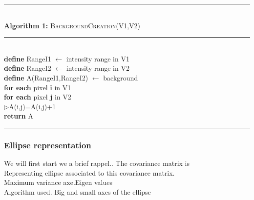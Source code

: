 \begin{minipage}{1\textwidth}
%
\hrule
\textbf{\\Algorithm 1:} \textsc{BackgroundCreation}(V1,V2)
\hrule
\textbf{\\define}  RangeI1 $\leftarrow$  intensity range in V1\\ 
\textbf{define}  RangeI2 $\leftarrow$  intensity range in V2\\ 
\textbf{define}  A(RangeI1,RangeI2) $\leftarrow$ background\\  
%
\textbf{for each} pixel \textbf{i} in V1\\
\textbf{for each} pixel \textbf{j} in V2\\
%
$\triangleright$A(i,j)=A(i,j)+1\\
%
\textbf{return} A\\
%
\hrule
%
\end{minipage}

\subsubsection{Ellipse representation}
We will first start we a brief
%
rappel..
%
The covariance matrix is \\
Representing ellipse associated to this covariance matrix.\\
Maximum variance axe.Eigen values\\
Algorithm used.
Big and small axes of the ellipse\\
